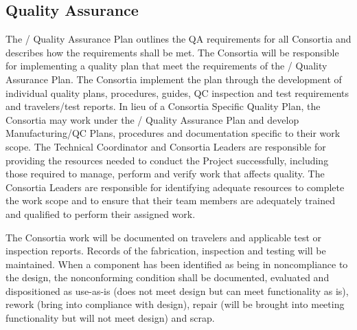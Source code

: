 \subsection{Quality Assurance}
\label{sec:fdsp-coord-qa}


The / Quality Assurance Plan outlines the QA
requirements for all  Consortia and describes how the
requirements shall be met. The Consortia will be responsible for
implementing a quality plan that meet the requirements of the
/ Quality Assurance Plan.  The Consortia
implement the plan through the development of individual quality
plans, procedures, guides, QC inspection and test requirements and
travelers/test reports.  In lieu of a Consortia Specific Quality Plan,
the Consortia may work under the / Quality
Assurance Plan and develop Manufacturing/QC Plans, procedures and
documentation specific to their work scope.  The 
Technical Coordinator and Consortia Leaders are responsible for
providing the resources needed to conduct the Project successfully,
including those required to manage, perform and verify work that
affects quality.  The  Consortia Leaders are responsible
for identifying adequate resources to complete the work scope and to
ensure that their team members are adequately trained and qualified to
perform their assigned work.

The Consortia work will be documented on travelers and applicable test
or inspection reports. Records of the fabrication, inspection and
testing will be maintained. When a component has been identified as
being in noncompliance to the design, the nonconforming condition
shall be documented, evaluated and dispositioned as use-as-is (does
not meet design but can meet functionality as is), rework (bring into
compliance with design), repair (will be brought into meeting
functionality but will not meet design) and scrap.

